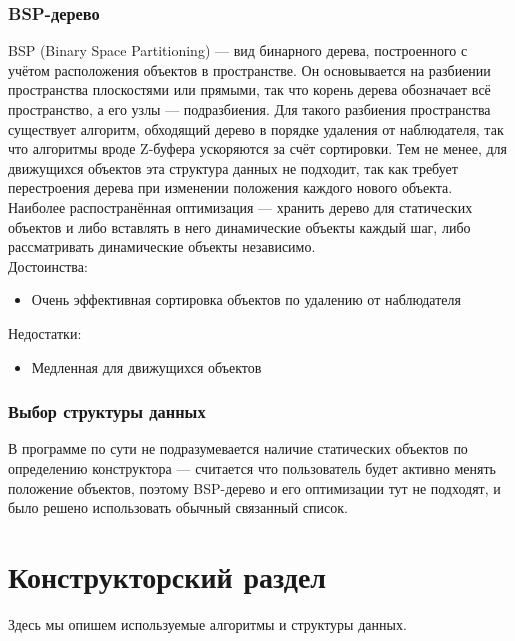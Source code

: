 \documentclass[a4paper,12pt]{report}
\numberwithin{equation}{section}
\begin{document}
\subsubsection*{BSP-дерево}
BSP (Binary Space Partitioning) \cite{bsptrees} --- вид бинарного дерева, построенного с учётом расположения объектов в пространстве. Он основывается на разбиении пространства плоскостями или прямыми, так что корень дерева обозначает всё пространство, а его узлы --- подразбиения. Для такого разбиения пространства существует алгоритм, обходящий дерево в порядке удаления от наблюдателя, так что алгоритмы вроде Z-буфера ускоряются за счёт сортировки. Тем не менее, для движущихся объектов эта структура данных не подходит, так как требует перестроения дерева при изменении положения каждого нового объекта. Наиболее распостранённая оптимизация --- хранить дерево для статических объектов и либо вставлять в него динамические объекты каждый шаг, либо рассматривать динамические объекты независимо. \\
Достоинства:
\begin{itemize}
\item Очень эффективная сортировка объектов по удалению от наблюдателя
\end{itemize}
Недостатки:
\begin{itemize}
\item Медленная для движущихся объектов
\end{itemize}

\subsubsection*{Выбор структуры данных}
В программе по сути не подразумевается наличие статических объектов по определению конструктора --- считается что пользователь будет активно менять положение объектов, поэтому BSP-дерево и его оптимизации тут не подходят, и было решено использовать обычный связанный список.

\newpage
\section{Конструкторский раздел}
Здесь мы опишем используемые алгоритмы и структуры данных.
\end{document}
